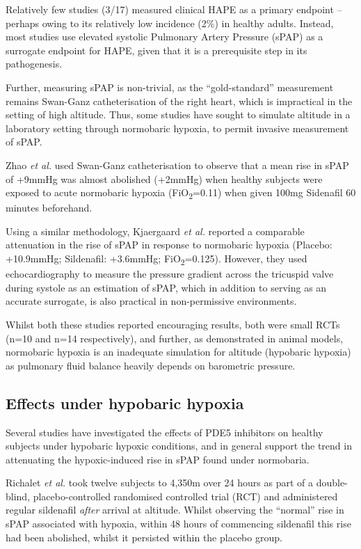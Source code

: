 \documentclass[12pt,a4paper]{article}
\begin{document}
Relatively few studies (3/17) measured clinical HAPE as a primary endpoint -- perhaps owing to its relatively low incidence (2\%) in healthy adults\cite{Bartsch:2002cg}. Instead, most studies use elevated systolic Pulmonary Artery Pressure (sPAP) as a surrogate endpoint for HAPE, given that it is a prerequisite step in its pathogenesis.\cite{Maggiorini:2001vq}

Further, measuring sPAP is non-trivial, as the ``gold-standard'' measurement remains Swan-Ganz catheterisation of the right heart, which is impractical in the setting of high altitude. Thus, some studies have sought to simulate altitude in a laboratory setting through normobaric hypoxia, to permit invasive measurement of sPAP.

Zhao \emph{et al.} used Swan-Ganz catheterisation to observe that a mean rise in sPAP of +9mmHg was almost abolished (+2mmHg) when healthy subjects were exposed to acute normobaric hypoxia (FiO\textsubscript{2}=0.11) when given 100mg Sidenafil 60 minutes beforehand.\cite{Zhao:2001kj}

Using a similar methodology, Kjaergaard \emph{et al.} reported a comparable attenuation in the rise of sPAP in response to normobaric hypoxia (Placebo: +10.9mmHg; Sildenafil: +3.6mmHg; FiO\textsubscript{2}=0.125).\cite{Kjaergaard:2007hp} However, they used echocardiography to measure the pressure gradient across the tricuspid valve during systole as an estimation of sPAP, which in addition to serving as an accurate surrogate, is also practical in non-permissive environments.\cite{Tramarin:1991uo,Allemann:2000tc}

Whilst both these studies reported encouraging results, both were small RCTs (n=10 and n=14 respectively), and further, as demonstrated in animal models, normobaric hypoxia is an inadequate simulation for altitude (hypobaric hypoxia) as pulmonary fluid balance heavily depends on barometric pressure.\cite{Bland:1977kz,Levine:1988uq}

\subsection*{Effects under hypobaric hypoxia}

Several studies have investigated the effects of PDE5 inhibitors on healthy subjects under hypobaric hypoxic conditions, and in general support the trend in attenuating the hypoxic-induced rise in sPAP found under normobaria.

Richalet \emph{et al.} took twelve subjects to 4,350m over 24 hours as part of a double-blind, placebo-controlled randomised controlled trial (RCT) and administered regular sildenafil \emph{after} arrival at altitude. Whilst observing the ``normal'' rise in sPAP associated with hypoxia, within 48 hours of commencing sildenafil this rise had been abolished, whilst it persisted within the placebo group.\cite{Richalet:2005el}
\end{document}

